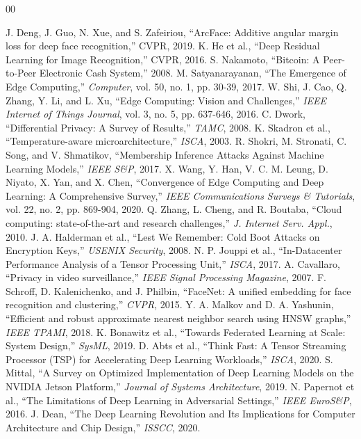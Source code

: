 \documentclass[conference]{IEEEtran}
\begin{document}
\begin{thebibliography}{00}

 J. Deng, J. Guo, N. Xue, and S. Zafeiriou, ``ArcFace: Additive angular margin loss for deep face recognition,'' CVPR, 2019.
 K. He et al., ``Deep Residual Learning for Image Recognition,'' CVPR, 2016.
 S. Nakamoto, ``Bitcoin: A Peer-to-Peer Electronic Cash System,'' 2008.
 M. Satyanarayanan, ``The Emergence of Edge Computing,'' \textit{Computer}, vol. 50, no. 1, pp. 30-39, 2017.
 W. Shi, J. Cao, Q. Zhang, Y. Li, and L. Xu, ``Edge Computing: Vision and Challenges,'' \textit{IEEE Internet of Things Journal}, vol. 3, no. 5, pp. 637-646, 2016.
 C. Dwork, ``Differential Privacy: A Survey of Results,'' \textit{TAMC}, 2008.
 K. Skadron et al., ``Temperature-aware microarchitecture,'' \textit{ISCA}, 2003.
 R. Shokri, M. Stronati, C. Song, and V. Shmatikov, ``Membership Inference Attacks Against Machine Learning Models,'' \textit{IEEE S\&P}, 2017.
 X. Wang, Y. Han, V. C. M. Leung, D. Niyato, X. Yan, and X. Chen, ``Convergence of Edge Computing and Deep Learning: A Comprehensive Survey,'' \textit{IEEE Communications Surveys \& Tutorials}, vol. 22, no. 2, pp. 869-904, 2020.
 Q. Zhang, L. Cheng, and R. Boutaba, ``Cloud computing: state-of-the-art and research challenges,'' \textit{J. Internet Serv. Appl.}, 2010.
 J. A. Halderman et al., ``Lest We Remember: Cold Boot Attacks on Encryption Keys,'' \textit{USENIX Security}, 2008.
 N. P. Jouppi et al., ``In-Datacenter Performance Analysis of a Tensor Processing Unit,'' \textit{ISCA}, 2017.
 A. Cavallaro, ``Privacy in video surveillance,'' \textit{IEEE Signal Processing Magazine}, 2007.
 F. Schroff, D. Kalenichenko, and J. Philbin, ``FaceNet: A unified embedding for face recognition and clustering,'' \textit{CVPR}, 2015.
 Y. A. Malkov and D. A. Yashunin, ``Efficient and robust approximate nearest neighbor search using HNSW graphs,'' \textit{IEEE TPAMI}, 2018.
 K. Bonawitz et al., ``Towards Federated Learning at Scale: System Design,'' \textit{SysML}, 2019.
 D. Abts et al., ``Think Fast: A Tensor Streaming Processor (TSP) for Accelerating Deep Learning Workloads,'' \textit{ISCA}, 2020.
 S. Mittal, ``A Survey on Optimized Implementation of Deep Learning Models on the NVIDIA Jetson Platform,'' \textit{Journal of Systems Architecture}, 2019.
 N. Papernot et al., ``The Limitations of Deep Learning in Adversarial Settings,'' \textit{IEEE EuroS\&P}, 2016.
 J. Dean, ``The Deep Learning Revolution and Its Implications for Computer Architecture and Chip Design,'' \textit{ISSCC}, 2020.


\end{thebibliography}
\end{document}
